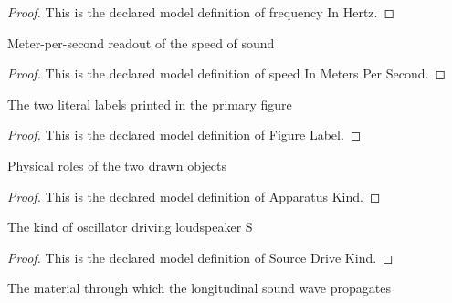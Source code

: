 \begin{proof}
  This is the declared model definition of frequency In Hertz.
\end{proof}
\begin{definition}
  \label{def:physics:phyx-mini-0318:phyxminiproblems-problemphyxmini0318-speedinmeterspersecond}
  Meter-per-second readout of the speed of sound
\end{definition}
\begin{proof}
  This is the declared model definition of speed In Meters Per Second.
\end{proof}
\begin{definition}
  \label{def:physics:phyx-mini-0318:phyxminiproblems-problemphyxmini0318-figurelabel}
  The two literal labels printed in the primary figure
\end{definition}
\begin{proof}
  This is the declared model definition of Figure Label.
\end{proof}
\begin{definition}
  \label{def:physics:phyx-mini-0318:phyxminiproblems-problemphyxmini0318-apparatuskind}
  Physical roles of the two drawn objects
\end{definition}
\begin{proof}
  This is the declared model definition of Apparatus Kind.
\end{proof}
\begin{definition}
  \label{def:physics:phyx-mini-0318:phyxminiproblems-problemphyxmini0318-sourcedrivekind}
  The kind of oscillator driving loudspeaker S
\end{definition}
\begin{proof}
  This is the declared model definition of Source Drive Kind.
\end{proof}
\begin{definition}
  \label{def:physics:phyx-mini-0318:phyxminiproblems-problemphyxmini0318-acousticmedium}
  The material through which the longitudinal sound wave propagates
\end{definition}
